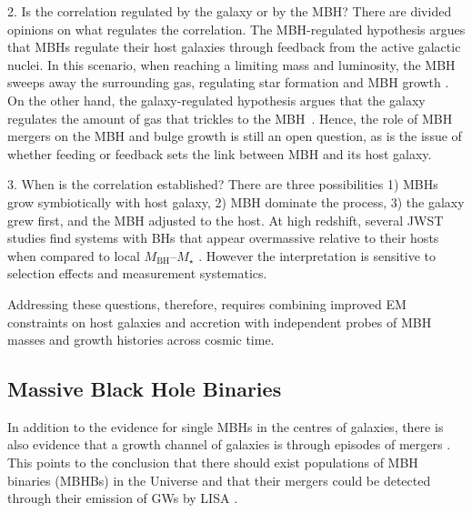 \documentclass[a4paper,12pt]{article}
\begin{document}
2. Is the correlation regulated by the galaxy or by the MBH? There are divided opinions on what regulates the correlation. The MBH-regulated hypothesis argues that MBHs regulate their host galaxies through feedback from the active galactic nuclei. In this scenario, when reaching a limiting mass and luminosity, the MBH sweeps away the surrounding gas, regulating star formation and MBH growth \cite{silk1998quasars,murray2005maximum}. On the other hand, the galaxy-regulated hypothesis argues that the galaxy regulates the amount of gas that trickles to the MBH~\cite{hopkins2010massive,angles2017gravitational}. Hence, the role of MBH mergers on the MBH and bulge growth is still an open question, as is the issue of whether feeding or feedback sets the link between MBH and its host galaxy. 

3. When is the correlation established? There are three possibilities 1) MBHs grow symbiotically with host galaxy, 2) MBH dominate the process, 3) the galaxy grew first, and the MBH adjusted to the host. At high redshift, several JWST studies find systems with BHs that appear overmassive relative to their hosts when compared to local $M_{\mathrm{BH}}$--$M_{\star}$ \cite{juodvzbalis2024dormant}. However the interpretation is sensitive to selection effects and measurement systematics.

Addressing these questions, therefore, requires combining improved EM constraints on host galaxies and accretion with independent probes of MBH masses and growth histories across cosmic time.

\subsection{Massive Black Hole Binaries}
\label{subsec:MBHBs}

In addition to the evidence for single MBHs in the centres of galaxies\cite{kormendy2013coevolution}, there is also evidence that a growth channel of galaxies is through episodes of mergers \cite{fakhouri2010merger,o2021emerge}. This points to the conclusion that there should exist populations of MBH binaries (MBHBs) in the Universe and that their mergers could be detected through their emission of GWs by LISA \cite{klein2016science,dayal2019hierarchical,chen2020dynamical}.
\end{document}
